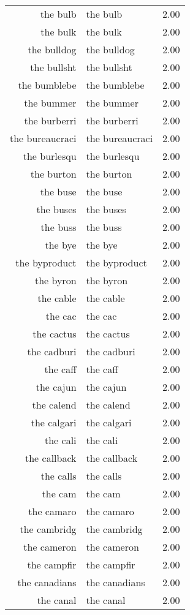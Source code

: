 \begin{table}[ht]
\begin{tabular}{rlr}
  the bulb & the bulb & 2.00 \\ 
  the bulk & the bulk & 2.00 \\ 
  the bulldog & the bulldog & 2.00 \\ 
  the bullsht & the bullsht & 2.00 \\ 
  the bumblebe & the bumblebe & 2.00 \\ 
  the bummer & the bummer & 2.00 \\ 
  the burberri & the burberri & 2.00 \\ 
  the bureaucraci & the bureaucraci & 2.00 \\ 
  the burlesqu & the burlesqu & 2.00 \\ 
  the burton & the burton & 2.00 \\ 
  the buse & the buse & 2.00 \\ 
  the buses & the buses & 2.00 \\ 
  the buss & the buss & 2.00 \\ 
  the bye & the bye & 2.00 \\ 
  the byproduct & the byproduct & 2.00 \\ 
  the byron & the byron & 2.00 \\ 
  the cable & the cable & 2.00 \\ 
  the cac & the cac & 2.00 \\ 
  the cactus & the cactus & 2.00 \\ 
  the cadburi & the cadburi & 2.00 \\ 
  the caff & the caff & 2.00 \\ 
  the cajun & the cajun & 2.00 \\ 
  the calend & the calend & 2.00 \\ 
  the calgari & the calgari & 2.00 \\ 
  the cali & the cali & 2.00 \\ 
  the callback & the callback & 2.00 \\ 
  the calls & the calls & 2.00 \\ 
  the cam & the cam & 2.00 \\ 
  the camaro & the camaro & 2.00 \\ 
  the cambridg & the cambridg & 2.00 \\ 
  the cameron & the cameron & 2.00 \\ 
  the campfir & the campfir & 2.00 \\ 
  the canadians & the canadians & 2.00 \\ 
  the canal & the canal & 2.00 \\ 

\end{tabular}
\end{table}
